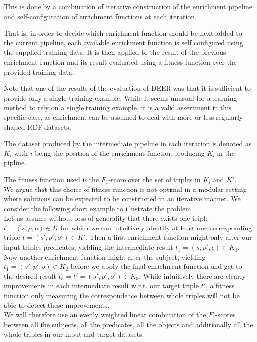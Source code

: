 This is done by a combination of iterative construction of the enrichment pipeline and self-configuration of enrichment functions at each iteration.

That is, in order to decide which enrichment function should be next added to the current pipeline, each available enrichment function is self configured using the supplied training data.
It is then applied to the result of the previous enrichment function and its result evaluated using a fitness function over the provided training data.

Note that one of the results of the evaluation of \ac{DEER} was that it is sufficient to provide only a single training example.
While it seems unusual for a learning method to rely on a single training example, it is a valid assertment in this specific case, as enrichment can be assumed to deal with more or less regularly shaped \ac{RDF} datasets.

The dataset produced by the intermediate pipeline in each iteration is denoted as $K_i$ with $i$ being the position of the enrichment function producing $K_i$ in the pipline.

The fitness function used is the $F_1$-score\cite{sasaki:ttm2007a} over the set of triples in $K_i$ and $K'$.\\

We argue that this choice of fitness function is not optimal in a modular setting where solutions can be expected to be constructed in an iterative manner.
We consider the following short example to illustrate the problem. \\

Let us assume without loss of generality that there exists one triple $t=(s,p,o)\in K$ for which we can intuitively identify at least one corresponding triple $t=(s',p',o')\in K'$.
Then a first enrichment function might only alter our input triples predicates, yielding the intermediate result $t_1=(s,p',o)\in K_1$. Now another enrichment function might alter the subject, yielding $t_1=(s',p',o)\in K_2$ before we apply the final enrichment function and get to the desired result $t_3=t'=(s',p',o')\in K_3$.
While intuitively there are clearly improvements in each intermediate result w.r.t. our target triple $t'$, a fitness function only measuring the correspondence between whole triples will not be able to detect these improvements.\\

We will therefore use an evenly weighted linear combination of the $F_1$-scores between all the subjects, all the predicates, all the objects and additionally all the whole triples in our input and target datasets.

